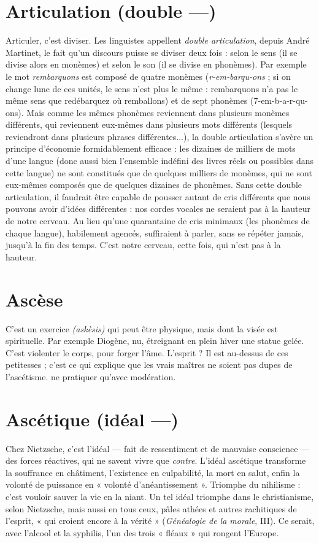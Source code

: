 \section{Articulation (double —)}
Articuler, c’est diviser. Les linguistes appellent
{\it double articulation}, depuis André Martinet,
le fait qu’un discours puisse se diviser deux fois : selon le sens (il se divise
alors en monèmes) et selon le son (il se divise en phonèmes). Par exemple le mot
{\it rembarquons} est composé de quatre monèmes ({\it r-em-barqu-ons} ; si on change
lune de ces unités, le sens n’est plus le même : rembarquons n’a pas le même sens
que redébarquez où remballons) et de sept phonèmes (7-em-b-a-r-qu-ons). Mais
comme les mêmes phonèmes reviennent dans plusieurs monèmes différents, qui
reviennent eux-mêmes dans plusieurs mots différents (lesquels reviendront dans
plusieurs phrases différentes...), la double articulation s'avère un principe d’économie
formidablement efficace : les dizaines de milliers de mots d’une langue
(donc aussi bien l’ensemble indéfini des livres réels ou possibles dans cette langue)
ne sont constitués que de quelques milliers de monèmes, qui ne sont eux-mêmes
composés que de quelques dizaines de phonèmes. Sans cette double articulation,
il faudrait être capable de pousser autant de cris différents que nous pouvons
avoir d’idées différentes : nos cordes vocales ne seraient pas à la hauteur de notre
cerveau. Au lieu qu’une quarantaine de cris minimaux (les phonèmes de chaque
langue), habilement agencés, suffiraient à parler, sans se répéter jamais, jusqu’à la
fin des temps. C’est notre cerveau, cette fois, qui n’est pas à la hauteur.

\section{Ascèse}
C’est un exercice {\it (askèsis)} qui peut être physique, mais dont la visée
est spirituelle. Par exemple Diogène, nu, étreignant en plein hiver
une statue gelée. C’est violenter le corps, pour forger l'âme. L’esprit ? Il est au-dessus
de ces petitesses ; c’est ce qui explique que les vrais maîtres ne soient pas
dupes de l’ascétisme.
ne pratiquer qu'avec modération.

\section{Ascétique (idéal —)}
Chez Nietzsche, c’est l’idéal — fait de ressentiment
et de mauvaise conscience — des forces réactives,
qui ne savent vivre que {\it contre}. L'idéal ascétique transforme la souffrance en
châtiment, l’existence en culpabilité, la mort en salut, enfin la volonté de puissance
en « volonté d’anéantissement ». Triomphe du nihilisme : c’est vouloir
sauver la vie en la niant. Un tel idéal triomphe dans le christianisme, selon
Nietzsche, mais aussi en tous ceux, pâles athées et autres rachitiques de l'esprit,
« qui croient encore à la vérité » ({\it Généalogie de la morale}, III). Ce serait, avec
l'alcool et la syphilis, l’un des trois « fléaux » qui rongent l’Europe.

